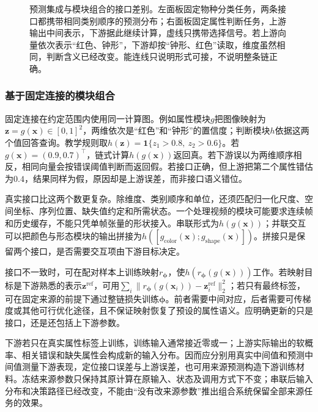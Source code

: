 \begin{figure}[htbp]
  \centering
  
  \caption{预测集成与模块组合的接口差别。左面板固定物种分类任务，两条接口都携带相同类别顺序的预测分布；右面板固定属性判断任务，上游输出中间表示，下游据此继续计算，虚线只携带选择信号。若上游向量依次表示“红色、钟形”，下游却按“钟形、红色”读取，维度虽然相同，判断含义已经改变。能连线只说明形式可接，不说明整条链正确。}
  \label{fig:ket-integration-interfaces}
\end{figure}

\subsubsection{基于固定连接的模块组合}
\label{sec:ket-integration-fixed-modules}

固定连接在约定范围内使用同一计算图。例如属性模块$g$把图像映射为$\bm{z}=g(\bm{x})\in[0,1]^2$，两维依次是“红色”和“钟形”的置信度；判断模块$h$依据这两个值回答查询。教学规则取$h(\bm{z})=\mathbf{1}\{z_1>0.8,\ z_2>0.6\}$。若$g(\bm{x})=(0.9,0.7)^\top$，链式计算$h(g(\bm{x}))$返回真。若下游误以为两维顺序相反，相同向量会按错误阈值判断而返回假。若接口正确，但上游把第二个属性错估为$0.4$，结果同样为假，原因却是上游误差，而非接口语义错位。

真实接口比这两个数更复杂。除维度、类别顺序和单位，还须匹配归一化尺度、空间坐标、序列位置、缺失值约定和所需状态。一个处理视频的模块可能要求连续帧和历史缓存，不能只凭单帧张量的形状接入。串联形式为$h(g(\bm{x}))$；并联交互可以把颜色与形态模块的输出拼接为$h([g_{\mathrm{color}}(\bm{x});g_{\mathrm{shape}}(\bm{x})])$。拼接只是保留两个接口，是否需要交互项由下游目标决定。

接口不一致时，可在配对样本上训练映射$r_{\bm{\phi}}$，使$h(r_{\bm{\phi}}(g(\bm{x})))$工作。若映射目标是下游熟悉的表示$\bm{z}^{\mathrm{ref}}$，可用$\sum_i\lVert r_{\bm{\phi}}(g(\bm{x}_i))-\bm{z}^{\mathrm{ref}}_i\rVert_2^2$；若只有最终标签，可在固定来源的前提下通过整链损失训练$\bm{\phi}$。前者需要中间对应，后者需要可传梯度或其他可行优化途径，且不保证映射恢复了预设的属性语义。应明确更新的只是接口，还是还包括上下游参数。

下游若只在真实属性标签上训练，训练输入通常接近零或一；上游实际输出的软概率、相关错误和缺失属性会构成新的输入分布。因而应分别用真实中间值和预测中间值测量下游表现，定位接口误差与上游误差，也可用来源预测构造下游训练材料。冻结来源参数只保持其原计算在原输入、状态及调用方式下不变；串联后输入分布和决策路径已经改变，不能由“没有改来源参数”推出组合系统保留全部来源任务的效果。

